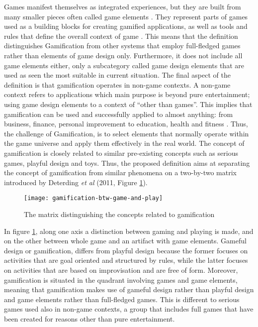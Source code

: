 Games manifest themselves as integrated experiences, but they are built from many smaller pieces often called game elements \cite{werbach2012win}. They represent parts of games used as a building blocks for creating gamified applications, as well as tools and rules that define the overall context of game \cite{gamDesElem}. This means that the definition distinguishes Gamification from other systems that employ full-fledged games rather than elements of game design only. Furthermore, it does not include all game elements either, only a subcategory called game design elements that are used as seen the most suitable in current situation. %
The final aspect of the definition is that gamification operates in non-game contexts. A non-game context refers to applications which main purpose is beyond pure entertainment; using game design elements to a context of ``other than games''. This implies that gamification can be used and successfully applied to almost anything: from business, finance, personal improvement to education, health and fitness \cite{deterding2011game}. Thus, the challenge of Gamification, is to select elements that normally operate within the game universe and apply them effectively in the real world.
The concept of gamification is closely related to similar pre-existing concepts such as serious games, playful design and toys. Thus, the proposed definition aims at separating the concept of gamification from similar phenomena on a two-by-two matrix introduced by Deterding \textit{et al} (2011, Figure \ref{fig:mesh1}). 
\begin{figure}[h]
    \centering
    \texttt{[image: gamification-btw-game-and-play]}
    \caption{The matrix distinguishing the concepts related to gamification}
    \label{fig:mesh1}
\end{figure}
In figure \ref{fig:mesh1}, along one axis a distinction between gaming and playing is made, and on the other between whole game and an artifact with game elements. Gameful design or gamification, differs from playful design because the former focuses on activities that are goal oriented and structured by rules, while the latter focuses on activities that are based on improvisation and are free of form. Moreover, gamification is situated in the quadrant involving games and game elements, meaning that gamification makes use of gameful design rather than playful design and game elements rather than full-fledged games. This is different to serious games used also in non-game contexts, a group that includes full games that have been created for reasons other than pure entertainment. 
